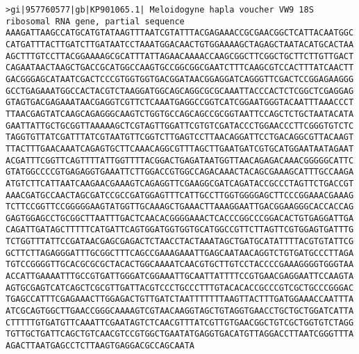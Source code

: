 \documentclass[11pt]{article}
\begin{document}
\begin{Verbatim}[commandchars=\\\{\}]
>gi|957760577|gb|KP901065.1| Meloidogyne hapla voucher VW9 18S ribosomal RNA gene, partial sequence
AAAGATTAAGCCATGCATGTATAAGTTTAATCGTATTTACGAGAAACCGCGAACGGCTCATTACAATGGC
CATGATTTACTTGATCTTGATAATCCTAAATGGACAACTGTGGAAAAGCTAGAGCTAATACATGCACTAA
AGCTTTGTCCTTACGGAAAAGCGCATTTATTAGAACAAAACCAAGCGGCTTCGGCTGCTTCTTGTTGACT
CAGAATAACTAAGCTGACCGCATGGCCAAGTGCCGGCGGCGAATCTTTCAAGCGTCCACTTTATCAACTT
GACGGGAGCATAATCGACTCCCGTGGTGGTGACGGATAACGGAGGATCAGGGTTCGACTCCGGAGAAGGG
GCCTGAGAAATGGCCACTACGTCTAAGGATGGCAGCAGGCGCGCAAATTACCCACTCTCGGCTCGAGGAG
GTAGTGACGAGAAATAACGAGGTCGTTCTCAAATGAGGCCGGTCATCGGAATGGGTACAATTTAAACCCT
TTAACGAGTATCAAGCAGAGGGCAAGTCTGGTGCCAGCAGCCGCGGTAATTCCAGCTCTGCTAATACATA
GAATTATTGCTGCGGTTAAAAAGCTCGTAGTTGGATTCGTGTCGATACCCTGGAACCCTTCGGGTGTCTC
TAGGTGTTATCGATTTATCGTAATGTTCGGTCTTGAGTCCTTAACAGGATTCCTGACAGGCGTTACAAGT
TTACTTTGAACAAATCAGAGTGCTTCAAACAGGCGTTTAGCTTGAATGATCGTGCATGGAATAATAGAAT
ACGATTTCGGTTCAGTTTTATTGGTTTTACGGACTGAGATAATGGTTAACAGAGACAAACGGGGGCATTC
GTATGGCCCCGTGAGAGGTGAAATTCTTGGACCGTGGCCAGACAAACTACAGCGAAAGCATTTGCCAAGA
ATGTCTTCATTAATCAAGAACGAAAGTCAGAGGTTCGAAGGCGATCAGATACCGCCCTAGTTCTGACCGT
AAACGATGCCAACTAGCGATCCGCCGATGGAGTTTCATTGCCTTGGTGGGGAGCTTCCCGGAAACGAAAG
TCTTCCGGTTCCGGGGGAAGTATGGTTGCAAAGCTGAAACTTAAAGGAATTGACGGAAGGGCACCACCAG
GAGTGGAGCCTGCGGCTTAATTTGACTCAACACGGGGAAACTCACCCGGCCCGGACACTGTGAGGATTGA
CAGATTGATAGCTTTTTCATGATTCAGTGGATGGTGGTGCATGGCCGTTCTTAGTTCGTGGAGTGATTTG
TCTGGTTTATTCCGATAACGAGCGAGACTCTAACCTACTAAATAGCTGATGCATATTTTACGTGTATTCG
GCTTCTTAGAGGGATTTGCGGCTTTCAGCCGAAAGAAATTGAGCAATAACAGGTCTGTGATGCCCTTAGA
TGTCCGGGGTTGCACGCGCGCTACACTGGCAAAATCAACGTGCTTGTCCTACCCCGAAAGGGGTGGGTAA
ACCATTGAAAATTTGCCGTGATTGGGATCGGAAATTGCAATTATTTTCCGTGAACGAGGAATTCCAAGTA
AGTGCGAGTCATCAGCTCGCGTTGATTACGTCCCTGCCCTTTGTACACACCGCCCGTCGCTGCCCGGGAC
TGAGCCATTTCGAGAAACTTGGAGACTGTTGATCTAATTTTTTTAAGTTACTTTGATGGAAACCAATTTA
ATCGCAGTGGCTTGAACCGGGCAAAAGTCGTAACAAGGTAGCTGTAGGTGAACCTGCTGCTGGATCATTA
CTTTTTGTGATGTTCAAATTCGAATAGTCTCAACGTTTATCGTTGTGAACGGCTGTCGCTGGTGTCTAGG
TGTTGCTGATTCAGCTGTCAACGTCCGTGGCTGAATATGAGGTGACATGTTAGGACCTTAATCGGGTTTA
AGACTTAATGAGCCTCTTAAGTGAGGACGCCAGCAATA


\end{Verbatim}
\end{document}
